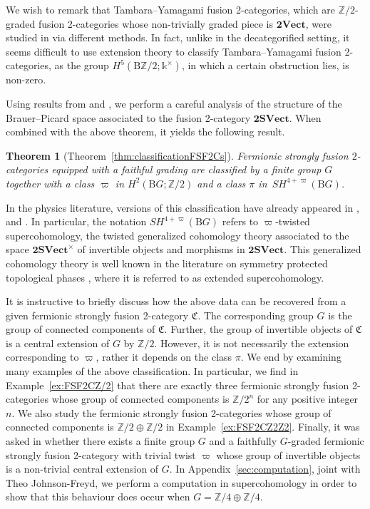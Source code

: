 \documentclass[pdftex]{sigma}
\newtheorem*{Theorem*}{Theorem}
\numberwithin{equation}{section}
\begin{document}
We wish to remark that Tambara--Yamagami fusion 2-categories, which are $\mathbb{Z}/2$-graded fusion 2-categories whose non-trivially graded piece is $\mathbf{2Vect}$, were studied in \cite{DY23} via different methods. In fact, unlike in the decategorified setting, it seems difficult to use extension theory to classify Tambara--Yamagami fusion 2-categories, as the group $H^5(\mathrm{B}\mathbb{Z}/2;\mathds{k}^{\times})$, in which a certain obstruction lies, is non-zero.

Using results from \cite{GJF0} and \cite{JFR}, we perform a careful analysis of the structure of the Brauer--Picard space associated to the fusion 2-category $\mathbf{2SVect}$. When combined with the above theorem, it yields the following result.

\begin{Theorem*}[Theorem~\ref{thm:classificationFSF2Cs}]
Fermionic strongly fusion $2$-categories equipped with a faithful grading are classified by a finite group $G$ together with a class $\varpi$ in $H^2(\mathrm{B}G;\mathbb{Z}/2)$ and a class $\pi$ in~$SH^{4+\varpi}(\mathrm{B}G)$.
\end{Theorem*}

In the physics literature, versions of this classification have already appeared in \cite{LW}, and \cite[Section~V.D]{JF}. In particular, the notation $SH^{4+\varpi}(\mathrm{B}G)$ refers to $\varpi$-twisted supercohomology, the twisted generalized cohomology theory associated to the space $\mathbf{2SVect}^{\times}$ of invertible objects and morphisms in $\mathbf{2SVect}$. This generalized cohomology theory is well known in the literature on symmetry protected topological phases \cite{GJF0,KT,WG}, where it is referred to as extended supercohomology.

It is instructive to briefly discuss how the above data can be recovered from a given fermionic strongly fusion 2-category $\mathfrak{C}$. The corresponding group $G$ is the group of connected components of $\mathfrak{C}$. Further, the group of invertible objects of $\mathfrak{C}$ is a central extension of $G$ by $\mathbb{Z}/2$. However, it is not necessarily the extension corresponding to $\varpi$, rather it depends on the class $\pi$. We end by examining many examples of the above classification. In particular, we find in Example~\ref{ex:FSF2CZ/2} that there are exactly three fermionic strongly fusion 2-categories whose group of connected components is $\mathbb{Z}/2^n$ for any positive integer $n$. We also study the fermionic strongly fusion 2-categories whose group of connected components is $\mathbb{Z}/2\oplus\mathbb{Z}/2$ in Example~\ref{ex:FSF2CZ2Z2}. Finally, it was asked in \cite{JFY} whether there exists a finite group $G$ and a faithfully $G$-graded fermionic strongly fusion 2-category with trivial twist $\varpi$ whose group of invertible objects is a non-trivial central extension of $G$. In Appendix~\ref{sec:computation}, joint with Theo Johnson-Freyd, we perform a computation in supercohomology in order to show that this behaviour does occur when $G=\mathbb{Z}/4\oplus \mathbb{Z}/4$.
\end{document}
